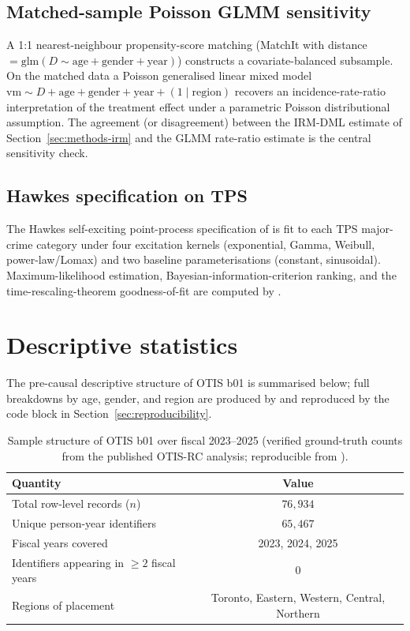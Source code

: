\documentclass[article,shortnames,nojss]{jss}
\newcommand{\OTIS}{\textsf{OTIS}}
\newcommand{\TPS}{\textsf{TPS}}
\newcommand{\vm}{\ensuremath{\mathrm{vm}}}
\begin{document}
\subsection{Matched-sample Poisson GLMM sensitivity}
\label{sec:methods-matchit}

A 1:1 nearest-neighbour propensity-score matching (MatchIt with
distance $= \mathrm{glm}(D \sim \mathrm{age} + \mathrm{gender} +
\mathrm{year})$) constructs a covariate-balanced subsample. On the
matched data a Poisson generalised linear mixed model
$\vm \sim D + \mathrm{age} + \mathrm{gender} + \mathrm{year} +
(1 \mid \mathrm{region})$ recovers an incidence-rate-ratio
interpretation of the treatment effect under a parametric Poisson
distributional assumption. The agreement (or disagreement) between
the IRM-DML estimate of Section~\ref{sec:methods-irm} and the GLMM
rate-ratio estimate is the central sensitivity check.


\subsection[Hawkes specification on TPS]{Hawkes specification on \TPS{}}
\label{sec:methods-hawkes}

The Hawkes self-exciting point-process specification of
\citet{Ruhela2026Hawkes} is fit to each \TPS{} major-crime category
under four excitation kernels (exponential, Gamma, Weibull,
power-law/Lomax) and two baseline parameterisations (constant,
sinusoidal). Maximum-likelihood estimation, Bayesian-information-criterion
ranking, and the time-rescaling-theorem goodness-of-fit
\citep{BrownEtAl2002} are computed by
.

\section{Descriptive statistics}
\label{sec:descriptives}

The pre-causal descriptive structure of \OTIS{} b01 is summarised
below; full breakdowns by age, gender, and region are produced by
 and reproduced by the code block
in Section~\ref{sec:reproducibility}.

\begin{table}[h]
\centering
\caption{Sample structure of \OTIS{} b01 over fiscal 2023--2025
(verified ground-truth counts from the published OTIS-RC analysis;
reproducible from ).}
\label{tab:otis-counts}
\begin{tabular}{lc}
\toprule
Quantity & Value \\
\midrule
Total row-level records ($n$) & $76{,}934$ \\
Unique person-year identifiers & $65{,}467$ \\
Fiscal years covered & 2023, 2024, 2025 \\
Identifiers appearing in $\ge 2$ fiscal years & $0$ \\
Regions of placement & Toronto, Eastern, Western, Central, Northern \\
\bottomrule
\end{tabular}
\end{table}
\end{document}
